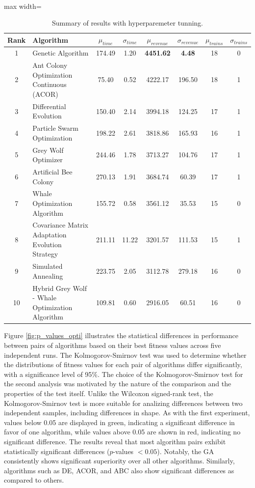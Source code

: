 \documentclass[Afour,sagev,times]{sagej}
\begin{document}
\begin{table}[htbp]
\centering
\caption{Summary of results with hyperparemeter tunning.}
\begin{adjustbox}{max width=\textwidth}
\begin{tabular}{|c|l|c|c|c|c|c|c|}
\hline
\textbf{Rank} & \textbf{Algorithm} & \(\mu_{time}\) & \(\sigma_{time}\) & \(\mu_{revenue}\) & \(\sigma_{revenue}\) & \(\mu_{trains}\) & \(\sigma_{trains}\) \\ \hline \hline
1 & Genetic Algorithm & 174.49 & 1.20 & \textbf{4451.62} & \textbf{4.48} & 18 & 0 \\ \hline
2 & Ant Colony Optimization Continuous (ACOR) & 75.40 & 0.52 & 4222.17 & 196.50 & 18 & 1 \\ \hline
3 & Differential Evolution & 150.40 & 2.14 & 3994.18 & 124.25 & 17 & 1 \\ \hline
4 & Particle Swarm Optimization & 198.22 & 2.61 & 3818.86 & 165.93 & 16 & 1 \\ \hline
5 & Grey Wolf Optimizer & 244.46 & 1.78 & 3713.27 & 104.76 & 17 & 1 \\ \hline
6 & Artificial Bee Colony & 270.13 & 1.91 & 3684.74 & 60.39 & 17 & 1 \\ \hline
7 & Whale Optimization Algorithm & 155.72 & 0.58 & 3561.12 & 35.53 & 15 & 0 \\ \hline
8 & Covariance Matrix Adaptation Evolution Strategy & 211.11 & 11.22 & 3201.57 & 111.53 & 15 & 1 \\ \hline
9 & Simulated Annealing & 223.75 & 2.05 & 3112.78 & 279.18 & 16 & 0 \\ \hline
10 & Hybrid Grey Wolf - Whale Optimization Algorithm & 109.81 & 0.60 & 2916.05 & 60.51 & 16 & 0 \\ \hline
\end{tabular}
\end{adjustbox}
\label{tab:summary_results_compactHIPER}
\end{table}

Figure \ref{fig:p_values_opti} illustrates the statistical differences in performance between pairs of algorithms based on their best fitness values across five independent runs. The Kolmogorov-Smirnov test \cite{Kolmogorov33, Smirnov48} was used to determine whether the distributions of fitness values for each pair of algorithms differ significantly, with a significance level of 95\%. The choice of the Kolmogorov-Smirnov test for the second analysis was motivated by the nature of the comparison and the properties of the test itself. Unlike the Wilcoxon signed-rank test, the Kolmogorov-Smirnov test is more suitable for analizing differences between two independent samples, including differences in shape. As with the first experiment, values below 0.05 are displayed in green, indicating a significant difference in favor of one algorithm, while values above 0.05 are shown in red, indicating no significant difference. The results reveal that most algorithm pairs exhibit statistically significant differences ($p$-values $ < 0.05$). Notably, the \gls{GA} consistently shows significant superiority over all other algorithms. Similarly, algorithms such as \gls{DE}, \gls{ACOR}, and \gls{ABC} also show significant differences as compared to others.
\end{document}
